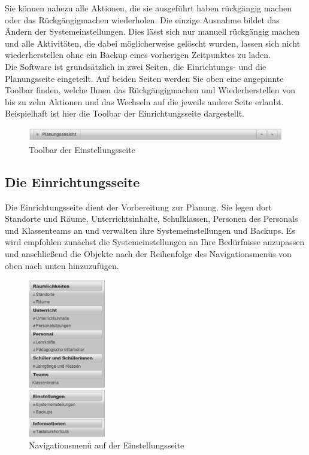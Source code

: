 \documentclass[fontsize=12pt]{scrartcl}
\begin{document}
Sie können nahezu alle Aktionen, die sie ausgeführt haben rückgängig machen oder das Rückgängigmachen wiederholen. Die einzige Ausnahme bildet das Ändern der Systemeinstellungen. Dies lässt sich nur manuell rückgängig machen und alle Aktivitäten, die dabei möglicherweise gelöscht wurden, lassen sich nicht wiederherstellen ohne ein Backup eines vorherigen Zeitpunktes zu laden.\\

Die Software ist grundsätzlich in zwei Seiten, die Einrichtungs- und die Planungsseite eingeteilt. Auf beiden Seiten werden Sie oben eine angepinnte Toolbar finden, welche Ihnen das Rückgängigmachen und Wiederherstellen von bis zu zehn Aktionen und das Wechseln auf die jeweils andere Seite erlaubt. Beispielhaft ist hier die Toolbar der Einrichtungsseite dargestellt.

\begin{figure}[H]
\includegraphics[width=\textwidth]{images/bar.png}
\caption{Toolbar der Einstellungsseite}
\end{figure}

\subsection{Die Einrichtungsseite}
Die Einrichtungsseite dient der Vorbereitung zur Planung. Sie legen dort Standorte und Räume, Unterrichtsinhalte, Schulklassen, Personen des Personals und Klassenteams an und verwalten ihre Systemeinstellungen und Backups. Es wird empfohlen zunächst die Systemeinstellungen an Ihre Bedürfnisse anzupassen und anschließend die Objekte nach der Reihenfolge des Navigationsmenüs von oben nach unten hinzuzufügen.
\begin{figure}[H]
\centering
\includegraphics[width=0.3\textwidth]{images/navigationMenu.png}
\caption{Navigationsmenü auf der Einstellungsseite}
\end{figure}
\end{document}
